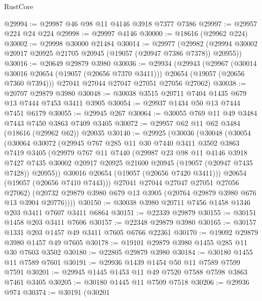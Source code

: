 \begin{lexlean}{RustCore}
\begin{coremodule}
@29994 := @29987 @46 @98 @11 @4146 @3918 @7377 @7386
@29997 := @29957 @224 @24 @224
@29998 := @29997 @4146
@30000 := @18616 (@29962 @224)
@30002 := @29998 @30000 @21484
@30014 := @29977
    (@29982 (@29994 @30002 @20917 @20925 @21705 @20945 (@19057 (@20947 @7386 @7378)) @20955))
@30016 := @20649 @29879 @3980
@30036 := @29934
    (@29943
      (@29967
        (@30014 @30016 @20654 (@19057 (@20656 @7370 @3411)))
        @20654
        (@19057 (@20656 @7360 @7394)))
      @27041
      @27044
      @27047
      @27051
      @27056
      @27062)
@30038 := @20707 @29879 @3980
@30048 := @30038 @3515 @20711 @7404 @1435 @679 @13 @7444 @7453 @3411 @3905
@30054 := @29937 @1434 @50 @13 @7444 @7451 @6179
@30055 := @29945 @267
@30064 := @30055 @769 @11 @49 @3484 @7443 @7450 @3863 @7409 @3405
@30072 := @29957 @62 @11 @62 @3484 (@18616 (@29962 @62)) @20035
@30140 := @29925
    (@30036
      (@30048
        (@30054
          (@30064
            @30072
            (@29945
              @767
              @285
              @11
              @30
              @7440
              @3411
              @3502
              @3863
              @7419
              @3405
              (@29979
                @767
                @11
                @7440
                (@29987
                  @23
                  @98
                  @11
                  @4146
                  @3918
                  @7427
                  @7435
                  @30002
                  @20917
                  @20925
                  @21600
                  @20945
                  (@19057 (@20947 @7435 @7428))
                  @20955))
              @30016
              @20654
              (@19057 (@20656 @7420 @3411)))
            @20654
            (@19057 (@20656 @7410 @7443)))
          @27041
          @27044
          @27047
          @27051
          @27056
          @27062)
        (@20732 @29879 @3980 @679 @13 @3905 (@20764 @29879 @3980 @676 @13 @3904 @20776))))
@30150 := @30038 @3980 @20711 @7456 @1458 @1346 @203 @3411 @7607 @3411 @6864
@30151 := @22339 @29879
@30155 := @30151 @1458 @203 @3411 @7606
@30157 := @22348 @29879 @3980
@30165 := @30157 @1331 @203 @1457 @49 @3411 @7605 @6766 @22361
@30170 := @19092 @29879 @3980 @1457 @49 @7605
@30178 := @19101 @29879 @3980 @1455 @285 @11 @30 @7603 @3502
@30180 := @22805 @29879 @3980
@30184 := @30180 @1455 @11 @7589 @7601
@30191 := @29936 @1439 @1454 @50 @11 @7589 @7599 @7591
@30201 := @29945 @1445 @1453 @11 @49 @7520 @7588 @7598 @3863 @7461 @3405
@30205 := @30180 @1445 @11 @7509 @7518
@30206 := @29936 @974
@30374 := @30191
    (@30201

\end{coremodule}
\end{lexlean}

